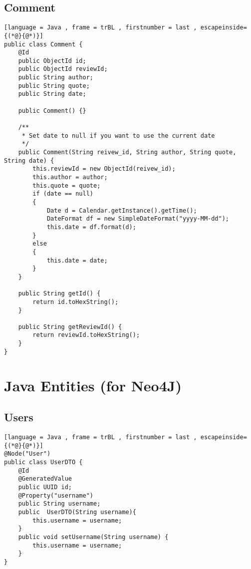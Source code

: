 \subsection{Comment}
\begin{lstlisting}[language = Java , frame = trBL , firstnumber = last , escapeinside={(*@}{@*)}]
public class Comment {
    @Id
    public ObjectId id;
    public ObjectId reviewId;
    public String author;
    public String quote;
    public String date;

    public Comment() {}

    /**
     * Set date to null if you want to use the current date
     */
    public Comment(String reivew_id, String author, String quote, String date) {
        this.reviewId = new ObjectId(reivew_id);
        this.author = author;
        this.quote = quote;
        if (date == null)
        {
            Date d = Calendar.getInstance().getTime();
            DateFormat df = new SimpleDateFormat("yyyy-MM-dd");
            this.date = df.format(d);
        }
        else
        {
            this.date = date;
        }
    }
    
    public String getId() {
        return id.toHexString();
    }

    public String getReviewId() {
        return reviewId.toHexString();
    }
}

\end{lstlisting}
\section{Java Entities (for Neo4J)}
\subsection{Users}
\begin{lstlisting}[language = Java , frame = trBL , firstnumber = last , escapeinside={(*@}{@*)}]
@Node("User")
public class UserDTO {
    @Id
    @GeneratedValue
    public UUID id;
    @Property("username")
    public String username;
    public  UserDTO(String username){
        this.username = username;
    }
    public void setUsername(String username) {
        this.username = username;
    }
}
\end{lstlisting}
